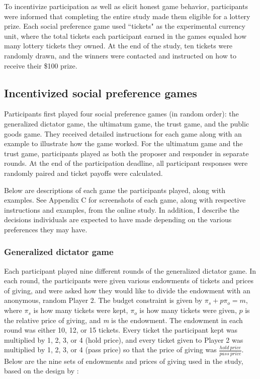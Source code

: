 \documentclass[12pt]{article}
\begin{document}
To incentivize participation as well as elicit honest game behavior, participants were informed that completing the entire study made them eligible for a lottery prize. Each social preference game used ``tickets" as the experimental currency unit, where the total tickets each participant earned in the games equaled how many lottery tickets they owned. At the end of the study, ten tickets were randomly drawn, and the winners were contacted and instructed on how to receive their \$100 prize.


\subsection{Incentivized social preference games}


Participants first played four social preference games (in random order): the generalized dictator game, the ultimatum game, the trust game, and the public goods game. They received detailed instructions for each game along with an example to illustrate how the game worked. For the ultimatum game and the trust game, participants played as both the proposer and responder in separate rounds. At the end of the participation deadline, all participant responses were randomly paired and ticket payoffs were calculated.

Below are descriptions of each game the participants played, along with examples. See Appendix C for screenshots of each game, along with respective instructions and examples, from the online study. In addition, I describe the decisions individuals are expected to have made depending on the various preferences they may have.

\subsubsection{Generalized dictator game}

Each participant played nine different rounds of the generalized dictator game. In each round, the participants were given various endowments of tickets and prices of giving, and were asked how they would like to divide the endowment with an anonymous, random Player 2. The budget constraint is given by \(\pi_{s} + p\pi_{o} = \textit{m}\), where \(\pi_{s}\) is how many tickets were kept, \(\pi_{o}\) is how many tickets were given, \(p\) is the relative price of giving, and \textit{m} is the endowment. The endowment in each round was either 10, 12, or 15 tickets. Every ticket the participant kept was multiplied by 1, 2, 3, or 4 (hold price), and every ticket given to Player 2 was multiplied by 1, 2, 3, or 4 (pass price) so that the price of giving was \(\frac{hold \ price}{pass \ price}\). Below are the nine sets of endowments and prices of giving used in the study, based on the design by \cite{andreoni_miller_2002}:
\end{document}
